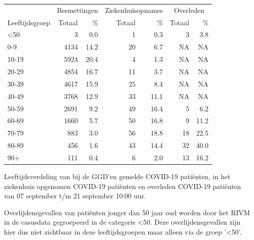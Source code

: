 \documentclass[
  english,
  man,floatsintext]{apa6}
\begin{document}
\begin{table}
\centering\begingroup\fontsize{11}{13}\selectfont

\begin{threeparttable}
\begin{tabular}{lrrrrrr}
\toprule
\multicolumn{1}{c}{ } & \multicolumn{2}{c}{Besmettingen} & \multicolumn{2}{c}{Ziekenhuisopnames} & \multicolumn{2}{c}{Overleden} \\
\cmidrule(l{3pt}r{3pt}){2-3} \cmidrule(l{3pt}r{3pt}){4-5} \cmidrule(l{3pt}r{3pt}){6-7}
Leeftijdsgroep & Totaal & \% & Totaal & \% & Totaal & \%\\
\midrule
<50 & 3 & 0.0 & 1 & 0.3 & 3 & 3.8\\
0-9 & 4134 & 14.2 & 20 & 6.7 & NA & NA\\
10-19 & 5924 & 20.4 & 4 & 1.3 & NA & NA\\
20-29 & 4854 & 16.7 & 11 & 3.7 & NA & NA\\
30-39 & 4617 & 15.9 & 25 & 8.4 & NA & NA\\
40-49 & 3768 & 12.9 & 33 & 11.1 & NA & NA\\
50-59 & 2691 & 9.2 & 49 & 16.4 & 5 & 6.2\\
60-69 & 1660 & 5.7 & 50 & 16.8 & 9 & 11.2\\
70-79 & 883 & 3.0 & 56 & 18.8 & 18 & 22.5\\
80-89 & 456 & 1.6 & 43 & 14.4 & 32 & 40.0\\
90+ & 111 & 0.4 & 6 & 2.0 & 13 & 16.2\\
\bottomrule
\end{tabular}
\begin{tablenotes}
\item[1] Leeftijdsverdeling van bij de GGD’en gemelde COVID-19 patiënten, in het ziekenhuis opgenomen COVID-19 patiënten en overleden COVID-19 patiënten van 07 september t/m 21 september 10:00 uur.
\item[2] Overlijdensgevallen van patiënten jonger dan 50 jaar oud worden door het RIVM in de casusdata gegroepeerd in de categorie <50. Deze overlijdensgevallen zijn hier dus niet zichtbaar in deze leeftijdsgroepen maar alleen via de groep '<50'.
\end{tablenotes}
\end{threeparttable}
\endgroup{}
\end{table}

\newpage
\end{document}
